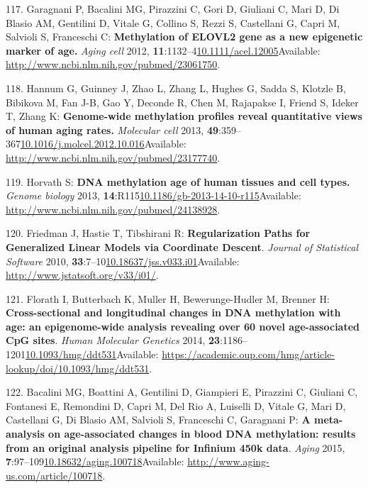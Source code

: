 \documentclass[
]{book}
\begin{document}
\leavevmode\hypertarget{ref-Garagnani2012}{}%
117. Garagnani P, Bacalini MG, Pirazzini C, Gori D, Giuliani C, Mari D, Di Blasio AM, Gentilini D, Vitale G, Collino S, Rezzi S, Castellani G, Capri M, Salvioli S, Franceschi C: \textbf{Methylation of ELOVL2 gene as a new epigenetic marker of age.} \emph{Aging cell} 2012, \textbf{11}:1132--4\href{https://doi.org/10.1111/acel.12005}{10.1111/acel.12005}Available: \url{http://www.ncbi.nlm.nih.gov/pubmed/23061750}.

\leavevmode\hypertarget{ref-Hannum2013}{}%
118. Hannum G, Guinney J, Zhao L, Zhang L, Hughes G, Sadda S, Klotzle B, Bibikova M, Fan J-B, Gao Y, Deconde R, Chen M, Rajapakse I, Friend S, Ideker T, Zhang K: \textbf{Genome-wide methylation profiles reveal quantitative views of human aging rates.} \emph{Molecular cell} 2013, \textbf{49}:359--367\href{https://doi.org/10.1016/j.molcel.2012.10.016}{10.1016/j.molcel.2012.10.016}Available: \url{http://www.ncbi.nlm.nih.gov/pubmed/23177740}.

\leavevmode\hypertarget{ref-Horvath2013}{}%
119. Horvath S: \textbf{DNA methylation age of human tissues and cell types.} \emph{Genome biology} 2013, \textbf{14}:R115\href{https://doi.org/10.1186/gb-2013-14-10-r115}{10.1186/gb-2013-14-10-r115}Available: \url{http://www.ncbi.nlm.nih.gov/pubmed/24138928}.

\leavevmode\hypertarget{ref-Friedman2010}{}%
120. Friedman J, Hastie T, Tibshirani R: \textbf{Regularization Paths for Generalized Linear Models via Coordinate Descent}. \emph{Journal of Statistical Software} 2010, \textbf{33}:7--10\href{https://doi.org/10.18637/jss.v033.i01}{10.18637/jss.v033.i01}Available: \url{http://www.jstatsoft.org/v33/i01/}.

\leavevmode\hypertarget{ref-Florath2014}{}%
121. Florath I, Butterbach K, Muller H, Bewerunge-Hudler M, Brenner H: \textbf{Cross-sectional and longitudinal changes in DNA methylation with age: an epigenome-wide analysis revealing over 60 novel age-associated CpG sites}. \emph{Human Molecular Genetics} 2014, \textbf{23}:1186--1201\href{https://doi.org/10.1093/hmg/ddt531}{10.1093/hmg/ddt531}Available: \url{https://academic.oup.com/hmg/article-lookup/doi/10.1093/hmg/ddt531}.

\leavevmode\hypertarget{ref-Bacalini2015}{}%
122. Bacalini MG, Boattini A, Gentilini D, Giampieri E, Pirazzini C, Giuliani C, Fontanesi E, Remondini D, Capri M, Del Rio A, Luiselli D, Vitale G, Mari D, Castellani G, Di Blasio AM, Salvioli S, Franceschi C, Garagnani P: \textbf{A meta-analysis on age-associated changes in blood DNA methylation: results from an original analysis pipeline for Infinium 450k data}. \emph{Aging} 2015, \textbf{7}:97--109\href{https://doi.org/10.18632/aging.100718}{10.18632/aging.100718}Available: \url{http://www.aging-us.com/article/100718}.
\end{document}
